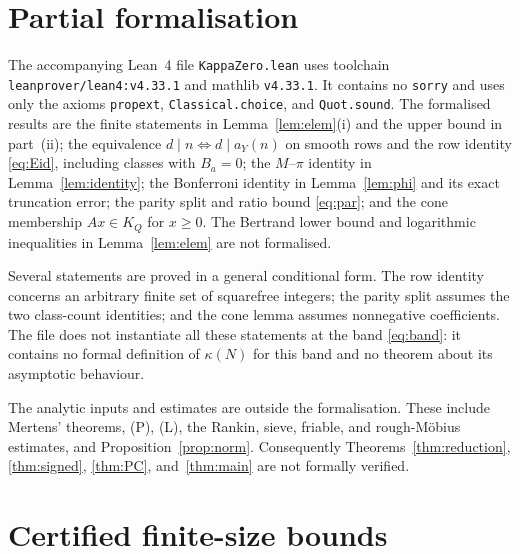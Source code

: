 \documentclass[11pt,a4paper]{article}
\theoremstyle{plain}
\theoremstyle{definition}
\theoremstyle{remark}
\begin{document}
\section{Partial formalisation}\label{sec:lean}
The accompanying Lean~4 file \texttt{KappaZero.lean} uses toolchain
\texttt{leanprover/\allowbreak lean4:v4.33.1} and mathlib \texttt{v4.33.1}.
It contains no \texttt{sorry} and uses only the axioms \texttt{propext},
\texttt{Classical.\allowbreak choice}, and \texttt{Quot.\allowbreak sound}.
The formalised results are the finite statements in Lemma~\ref{lem:elem}(i) and the upper bound in
part~(ii); the equivalence $d\mid n\Leftrightarrow d\mid a_Y(n)$ on smooth rows and the row identity
\eqref{eq:Eid}, including classes with $B_a=0$; the $M$--$\pi$ identity in Lemma~\ref{lem:identity};
the Bonferroni identity in Lemma~\ref{lem:phi} and its exact truncation error;
the parity split and ratio bound \eqref{eq:par}; and the cone membership $Ax\in K_Q$ for $x\ge0$.
The Bertrand lower bound and logarithmic inequalities in Lemma~\ref{lem:elem} are not formalised.

Several statements are proved in a general conditional form. The row identity concerns an arbitrary
finite set of squarefree integers; the parity split assumes the two class-count identities; and
the cone lemma assumes nonnegative coefficients. The file does not instantiate all these statements
at the band \eqref{eq:band}: it contains no formal definition of $\kappa(N)$ for this band and no
theorem about its asymptotic behaviour.

The analytic inputs and estimates are outside the formalisation. These include Mertens' theorems,
(P), (L), the Rankin, sieve, friable, and rough-M\"obius estimates, and
Proposition~\ref{prop:norm}. Consequently Theorems~\ref{thm:reduction}, \ref{thm:signed},
\ref{thm:PC}, and~\ref{thm:main} are not formally verified.

\section{Certified finite-size bounds}\label{sec:numerics}
\end{document}
